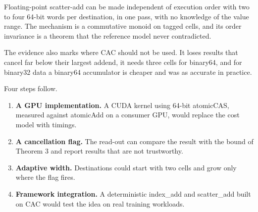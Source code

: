 \documentclass[journal]{IEEEtran}
\begin{document}
Floating-point scatter-add can be made independent of execution order
with two to four 64-bit words per destination, in one pass, with no
knowledge of the value range. The mechanism is a commutative monoid on
tagged cells, and its order invariance is a theorem that the reference
model never contradicted.

The evidence also marks where CAC should not be used. It loses results
that cancel far below their largest addend, it needs three cells for
binary64, and for binary32 data a binary64 accumulator is cheaper and
was as accurate in practice.

Four steps follow.

\begin{enumerate}
\def\labelenumi{\arabic{enumi}.}
\item
  \textbf{A GPU implementation.} A CUDA kernel using 64-bit atomicCAS,
  measured against atomicAdd on a consumer GPU, would replace the cost
  model with timings.
\item
  \textbf{A cancellation flag.} The read-out can compare the result with
  the bound of Theorem 3 and report results that are not trustworthy.
\item
  \textbf{Adaptive width.} Destinations could start with two cells and
  grow only where the flag fires.
\item
  \textbf{Framework integration.} A deterministic index\_add and
  scatter\_add built on CAC would test the idea on real training
  workloads.
\end{enumerate}
\end{document}
